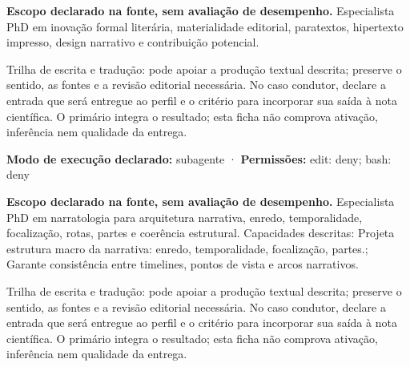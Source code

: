 
\begin{descricao}
\textbf{Escopo declarado na fonte, sem avaliação de desempenho.}
Especialista PhD em inovação formal literária, materialidade editorial, paratextos, hipertexto impresso, design narrativo e contribuição potencial.
\end{descricao}

\begin{funcao}
Trilha de escrita e tradução: pode apoiar a produção textual descrita; preserve o sentido, as fontes e a revisão editorial necessária. No caso condutor, declare a entrada que será entregue ao perfil e o critério para incorporar sua saída à nota científica. O primário integra o resultado; esta ficha não comprova ativação, inferência nem qualidade da entrega.
\end{funcao}

\begin{arquitetura}
\textbf{Modo de execução declarado:} subagente · \textbf{Permissões:} edit: deny; bash: deny
\end{arquitetura}


\begin{descricao}
\textbf{Escopo declarado na fonte, sem avaliação de desempenho.}
Especialista PhD em narratologia para arquitetura narrativa, enredo, temporalidade, focalização, rotas, partes e coerência estrutural. Capacidades descritas: Projeta estrutura macro da narrativa: enredo, temporalidade, focalização, partes.; Garante consistência entre timelines, pontos de vista e arcos narrativos.
\end{descricao}

\begin{funcao}
Trilha de escrita e tradução: pode apoiar a produção textual descrita; preserve o sentido, as fontes e a revisão editorial necessária. No caso condutor, declare a entrada que será entregue ao perfil e o critério para incorporar sua saída à nota científica. O primário integra o resultado; esta ficha não comprova ativação, inferência nem qualidade da entrega.
\end{funcao}


